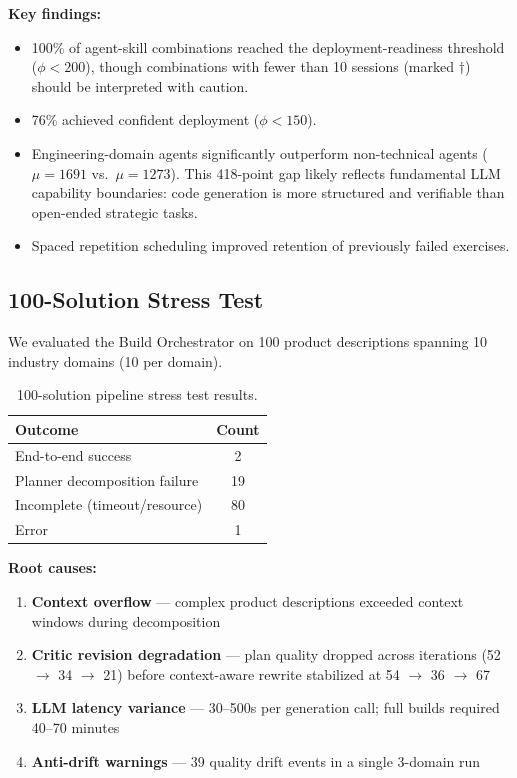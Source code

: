 \documentclass[11pt,a4paper]{article}
\begin{document}
\textbf{Key findings:}
\begin{itemize}[noitemsep]
    \item 100\% of agent-skill combinations reached the deployment-readiness threshold ($\phi < 200$), though combinations with fewer than 10 sessions (marked $\dagger$) should be interpreted with caution.
    \item 76\% achieved confident deployment ($\phi < 150$).
    \item Engineering-domain agents significantly outperform non-technical agents ($\mu = 1691$ vs.\ $\mu = 1273$). This 418-point gap likely reflects fundamental LLM capability boundaries: code generation is more structured and verifiable than open-ended strategic tasks.
    \item Spaced repetition scheduling improved retention of previously failed exercises.
\end{itemize}

\subsection{100-Solution Stress Test}

We evaluated the Build Orchestrator on 100 product descriptions spanning 10 industry domains (10 per domain).

\begin{table}[h]
\centering
\caption{100-solution pipeline stress test results.}
\label{tab:pipeline}
\begin{tabular}{lc}
\toprule
\textbf{Outcome} & \textbf{Count} \\
\midrule
End-to-end success & 2 \\
Planner decomposition failure & 19 \\
Incomplete (timeout/resource) & 80 \\
Error & 1 \\
\bottomrule
\end{tabular}
\end{table}

\textbf{Root causes:}
\begin{enumerate}[noitemsep]
    \item \textbf{Context overflow} --- complex product descriptions exceeded context windows during decomposition
    \item \textbf{Critic revision degradation} --- plan quality dropped across iterations (52 $\rightarrow$ 34 $\rightarrow$ 21) before context-aware rewrite stabilized at 54 $\rightarrow$ 36 $\rightarrow$ 67
    \item \textbf{LLM latency variance} --- 30--500s per generation call; full builds required 40--70 minutes
    \item \textbf{Anti-drift warnings} --- 39 quality drift events in a single 3-domain run
\end{enumerate}
\end{document}
